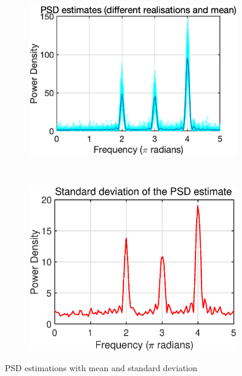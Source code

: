 \begin{figure}[htb]
     \centering
     \begin{subfigure}[b]{0.4\textwidth}
         \centering
         \includegraphics[width=\textwidth]{fig/13/13b1.eps}
     \end{subfigure}
     ~
     \begin{subfigure}[b]{0.4\textwidth}
         \centering
         \includegraphics[width=\textwidth]{fig/13/13b2.eps}
     \end{subfigure}
        \caption{PSD estimations with mean and standard deviation}
        \label{fig:1_3_b}
\end{figure}
